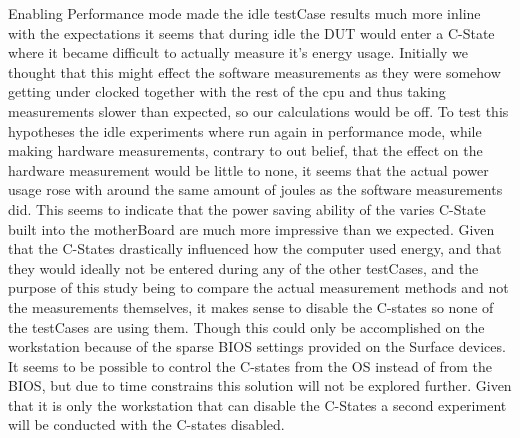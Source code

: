 Enabling Performance mode made the idle testCase results much more inline with the expectations it seems that during idle the DUT would enter a C-State where it became difficult to actually measure it's energy usage. Initially we thought that this might effect the software measurements as they were somehow getting under clocked together with the rest of the cpu and thus taking measurements slower than expected, so our calculations would be off. To test this hypotheses the idle experiments where run again in performance mode, while making hardware measurements, contrary to out belief, that the effect on the hardware measurement would be little to none, it seems that the actual power usage rose with around the same amount of joules as the software measurements did. This seems to indicate that the power saving ability of the varies C-State built into the motherBoard are much more impressive than we expected. Given that the C-States drastically influenced how the computer used energy, and that they would ideally not be entered during any of the other testCases, and the purpose of this study being to compare the actual measurement methods and not the measurements themselves, it makes sense to disable the C-states so none of the testCases are using them. Though this could only be accomplished on the workstation because of the sparse BIOS settings provided on the Surface devices.
It seems to be possible to control the C-states from the OS instead of from the BIOS, but due to time constrains this solution will not be explored further\cite{CMete,CLinux}. Given that it is only the workstation that can disable the C-States a second experiment will be conducted with the C-states disabled.

